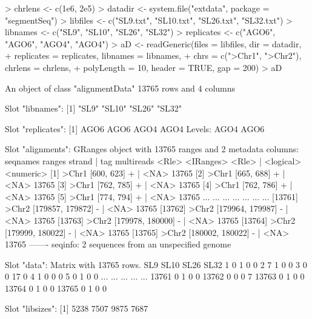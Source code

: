 \documentclass[a4paper]{article}
\begin{document}
\begin{Schunk}
\begin{Sinput}
> chrlens <- c(1e6, 2e5)
> datadir <- system.file("extdata", package = "segmentSeq")
> libfiles <- c("SL9.txt", "SL10.txt", "SL26.txt", "SL32.txt")
> libnames <- c("SL9", "SL10", "SL26", "SL32")
> replicates <- c("AGO6", "AGO6", "AGO4", "AGO4")
> aD <- readGeneric(files = libfiles, dir = datadir,
+                   replicates = replicates, libnames = libnames, 
+                   chrs = c(">Chr1", ">Chr2"), chrlens = chrlens,
+                   polyLength = 10, header = TRUE, gap = 200)
> aD
\end{Sinput}
\begin{Soutput}
An object of class "alignmentData"
13765 rows and 4 columns

Slot "libnames":
[1] "SL9"  "SL10" "SL26" "SL32"

Slot "replicates":
[1] AGO6 AGO6 AGO4 AGO4
Levels: AGO4 AGO6

Slot "alignments":
GRanges object with 13765 ranges and 2 metadata columns:
          seqnames           ranges strand   |       tag multireads
             <Rle>        <IRanges>  <Rle>   | <logical>  <numeric>
      [1]    >Chr1       [600, 623]      +   |      <NA>      13765
      [2]    >Chr1       [665, 688]      +   |      <NA>      13765
      [3]    >Chr1       [762, 785]      +   |      <NA>      13765
      [4]    >Chr1       [762, 786]      +   |      <NA>      13765
      [5]    >Chr1       [774, 794]      +   |      <NA>      13765
      ...      ...              ...    ... ...       ...        ...
  [13761]    >Chr2 [179857, 179872]      -   |      <NA>      13765
  [13762]    >Chr2 [179964, 179987]      -   |      <NA>      13765
  [13763]    >Chr2 [179978, 180000]      -   |      <NA>      13765
  [13764]    >Chr2 [179999, 180022]      -   |      <NA>      13765
  [13765]    >Chr2 [180002, 180022]      -   |      <NA>      13765
  -------
  seqinfo: 2 sequences from an unspecified genome

Slot "data":
Matrix with  13765  rows.
      SL9 SL10 SL26 SL32
1       0    1    0    0
2       7    1    0    0
3       0    0   17    0
4       1    0    0    0
5       0    1    0    0
...   ...  ...  ...  ...
13761   0    1    0    0
13762   0    0    0    7
13763   0    1    0    0
13764   0    1    0    0
13765   0    1    0    0

Slot "libsizes":
[1] 5238 7507 9875 7687
\end{Soutput}
\end{Schunk}
\end{document}
